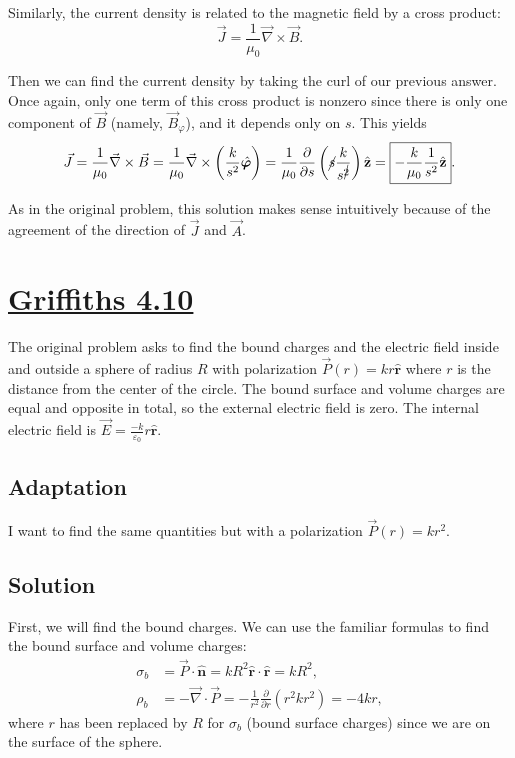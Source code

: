 \documentclass{article}
\newcommand{\zhat}{\hat{\textbf{z}}}
\newcommand{\rhat}{\hat{\textbf{r}}}
\newcommand{\vphihat}{\hat{\bm{\varphi}}}
\newcommand{\del}{\vec{\nabla}}
\begin{document}
Similarly, the current density is related to the magnetic field by a cross product:
\begin{equation}
	\vec{J} = \frac{1}{\mu_0}\del\times\vec{B}.
\end{equation}

Then we can find the current density by taking the curl of our previous answer. Once again, only one term of this cross product is nonzero since there is only one component of $\vec{B}$ (namely, $\vec{B}_\varphi$), and it depends only on $s$. This yields
\begin{align}
	\vec{J} = \frac{1}{\mu_0}\del\times\vec{B} = \frac{1}{\mu_0}\del\times\left(  \frac{k}{s^2}\vphihat\right) = \frac{1}{\mu_0}\frac{\partial}{\partial s}\left( \cancel{s}\frac{k}{s^{\cancel{2}}} \right)\zhat = \boxed{-\frac{k}{\mu_0}\frac{1}{s^2}\zhat}.
\end{align}

As in the original problem, this solution makes sense intuitively because of the agreement of the direction of $\vec{J}$ and $\vec{A}$.

\clearpage

\section*{\underline{Griffiths 4.10}}
The original problem asks to find the bound charges and the electric field inside and outside a sphere of radius $R$ with polarization $\vec{P}(r) = kr\rhat$ where ${r}$ is the distance from the center of the circle. The bound surface and volume charges are equal and opposite in total, so the external electric field is zero. The internal electric field is $\vec{E} = \frac{-k}{\varepsilon_0}r\rhat$.

\subsection*{Adaptation}
I want to find the same quantities but with a polarization $\vec{P}({r}) = k{r}^2$.

\subsection*{Solution}
First, we will find the bound charges. We can use the familiar formulas to find the bound surface and volume charges:
\begin{align}
	\sigma_b &= \vec{P}\cdot\hat{\textbf{n}} = kR^2\rhat\cdot \rhat = \boxed{kR^2}, \\
	\rho_b &= -\del\cdot\vec{P} = -\frac{1}{r^2}\frac{\partial}{\partial r}\left( r^2 kr^2 \right) = \boxed{-4kr},
\end{align}
where $r$ has been replaced by $R$ for $\sigma_b$ (bound surface charges) since we are on the surface of the sphere.
\end{document}
